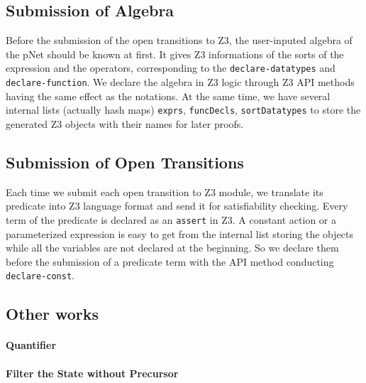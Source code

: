 \documentclass[a4paper]{lncs/llncs}
\begin{document}
\subsection{Submission of Algebra}
Before the submission of the open transitions to Z3, the user-inputed algebra of the pNet should be known at first. It gives Z3 informations of the sorts of the expression and the operators, corresponding to the  
\texttt{declare-datatypes} and \texttt{declare-function}. We declare the algebra in Z3 logic through Z3 API methods having the same effect as the notations. At the same time, we have several internal lists (actually hash maps) \texttt{exprs}, \texttt{funcDecls}, \texttt{sortDatatypes} to store the generated Z3 objects with their names for later proofs.

\subsection{Submission of Open Transitions}
Each time we submit each open transition to Z3 module, we translate its predicate into Z3 language format and send it for satisfiability checking. Every term of the predicate is declared as an \texttt{assert} in Z3. A constant action or a parameterized expression is easy to get from the internal list storing the objects while all the variables are not declared at the beginning. So we declare them before the submission of a predicate term with the API method conducting \texttt{declare-const}.

\subsection{Other works}
\paragraph{Quantifier}
\paragraph{Filter the State without Precursor}
\end{document}
